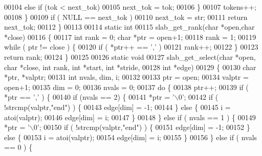 \begin{DoxyCode}
00104             \textcolor{keywordflow}{else} \textcolor{keywordflow}{if} (tok < next\_tok)
00105                 next\_tok = tok;
00106         \}
00107         tokens++;
00108     \}
00109     \textcolor{keywordflow}{if} ( NULL == next\_tok )
00110         next\_tok = str;
00111     \textcolor{keywordflow}{return} next\_tok;
00112 \}
00113 
00114 \textcolor{keyword}{static} \textcolor{keywordtype}{int}
00115 slab\_get\_rank(\textcolor{keywordtype}{char} *open,\textcolor{keywordtype}{char} *close)
00116 \{
00117     \textcolor{keywordtype}{int} rank = 0;    \textcolor{keywordtype}{char} *ptr = open+1;
00118     rank = 1;
00119     \textcolor{keywordflow}{while} ( ptr != close ) \{
00120         \textcolor{keywordflow}{if} ( *ptr++ == \textcolor{charliteral}{','} )
00121             rank++;
00122     \}
00123     \textcolor{keywordflow}{return} rank;
00124 \}
00125 
00126 \textcolor{keyword}{static} \textcolor{keywordtype}{void}
00127 slab\_get\_select(\textcolor{keywordtype}{char} *open, \textcolor{keywordtype}{char} *close, \textcolor{keywordtype}{int} rank, \textcolor{keywordtype}{int} *start, \textcolor{keywordtype}{int} *stride,
00128                 \textcolor{keywordtype}{int} *edge)
00129 \{
00130     \textcolor{keywordtype}{char} *ptr, *valptr;
00131     \textcolor{keywordtype}{int} nvals, dim, i;
00132 
00133     ptr = open;
00134     valptr = open+1;
00135     dim = 0;
00136     nvals = 0;
00137     \textcolor{keywordflow}{do} \{
00138         ptr++;
00139         \textcolor{keywordflow}{if} ( *ptr == \textcolor{charliteral}{','} ) \{
00140             \textcolor{keywordflow}{if} (nvals == 2) \{
00141                 *ptr = \textcolor{charliteral}{'\(\backslash\)0'};
00142                  \textcolor{keywordflow}{if} ( !strcmp(valptr,\textcolor{stringliteral}{"end"}) ) \{
00143                      edge[dim] = -1;
00144                  \} \textcolor{keywordflow}{else} \{
00145                      i = atoi(valptr);
00146                      edge[dim] = i;
00147                  \}
00148             \} \textcolor{keywordflow}{else} \textcolor{keywordflow}{if} ( nvals == 1 ) \{
00149                 *ptr = \textcolor{charliteral}{'\(\backslash\)0'};
00150                  \textcolor{keywordflow}{if} ( !strcmp(valptr,\textcolor{stringliteral}{"end"}) ) \{
00151                      edge[dim] = -1;
00152                  \} \textcolor{keywordflow}{else} \{
00153                      i = atoi(valptr);
00154                      edge[dim] = i;
00155                  \}
00156             \} \textcolor{keywordflow}{else} \textcolor{keywordflow}{if} ( nvals == 0 ) \{

\end{DoxyCode}
